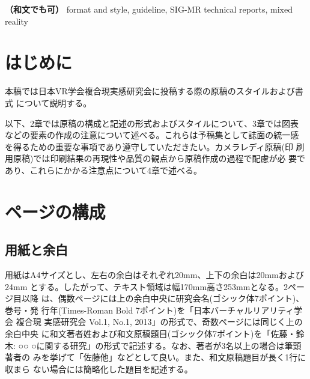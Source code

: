 \documentclass[a4paper,twoside]{jarticle}
\begin{document}

\begin{abstract}
{\bf（和文でも可）}
This paper describes guidelines for writing technical reports for SIG-MR, 
VRSJ. Detailed instructions on font size and styles of all elements in 
the paper, including headers and footnotes, paper title and authors, 
section and subsection headings, and reference list. Some specific notes 
for respectively review and final papers are also stated. All papers 
submitted for SIG-MR workshops are expected to follow these guidelines: 
it is very important for the aesthetic consistency of papers through a 
volume that each author strictly follows the guidelines. This document 
also serves as a sample document that provides authors a concrete 
appearance of formatted pages.
\end{abstract}

\begin{keyword}	
{\bf（和文でも可）}
format and style, guideline, SIG-MR technical reports, mixed reality
\end{keyword}

\maketitle	

\section{はじめに}
本稿では日本VR学会複合現実感研究会に投稿する際の原稿のスタイルおよび書式
について説明する。

以下、2章では原稿の構成と記述の形式およびスタイルについて、3章では図表
などの要素の作成の注意について述べる。これらは予稿集として誌面の統一感
を得るための重要な事項であり遵守していただきたい。カメラレディ原稿(印
刷用原稿)では印刷結果の再現性や品質の観点から原稿作成の過程で配慮が必
要であり、これらにかかる注意点について4章で述べる。

\section{ページの構成}

\subsection{用紙と余白}
用紙はA4サイズとし、左右の余白はそれぞれ20mm、上下の余白は20mmおよび24mm
とする。したがって、テキスト領域は幅170mm高さ253mmとなる。2ページ目以降
は、偶数ページには上の余白中央に研究会名(ゴシック体7ポイント)、巻号・発
行年(Times-Roman Bold 7ポイント)を「日本バーチャルリアリティ学会 複合現
実感研究会 Vol.1, No.1, 2013」の形式で、奇数ページには同じく上の余白中央
に和文著者姓および和文原稿題目(ゴシック体7ポイント)を「佐藤・鈴木: ○○
○に関する研究」の形式で記述する。なお、著者が3名以上の場合は筆頭著者の
みを挙げて「佐藤他」などとして良い。また、和文原稿題目が長く1行に収まら
ない場合には簡略化した題目を記述する。
\end{document}
